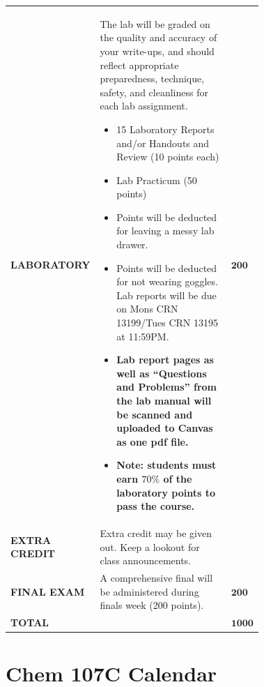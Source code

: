 \documentclass[11pt]{article}
\begin{document}
\begin{table}[H]
\begin{tabular}{|l|p{0.72\linewidth}|l|}
  \textbf{LABORATORY} & The lab will be graded on the quality and accuracy
    of your write-ups, and should reflect appropriate preparedness, technique, safety, and
    cleanliness for each lab assignment.
    \begin{itemize}
    \setlength\itemsep{0em}
    \item 15 Laboratory Reports and/or Handouts and Review
      (10 points each)
    \item Lab Practicum (50 points)
    \item Points will be deducted for leaving a messy lab drawer.
    \item Points will be deducted for not wearing goggles. Lab reports will be due
      on Mons CRN 13199/Tues CRN 13195  at 11:59PM.
    \item \textbf{Lab report pages as well as “Questions and Problems” from the lab
      manual will be scanned and uploaded to Canvas as one pdf file.}
    \item \textbf{Note: students must earn $70\%$ of the laboratory points to pass
      the course.}
    \end{itemize}
  & $\mathbf{200}$ \\

  \textbf{EXTRA CREDIT} & Extra credit may be given out. Keep a lookout for class announcements. & \\
    
  \textbf{FINAL EXAM} & A comprehensive final will be administered during finals week (200 points).
  & $\mathbf{200}$ \\

  \textbf{TOTAL} &  & $\mathbf{1000}$ \\
  \hline
\end{tabular}
\end{table}

\section{Chem 107C Calendar}
\end{document}
